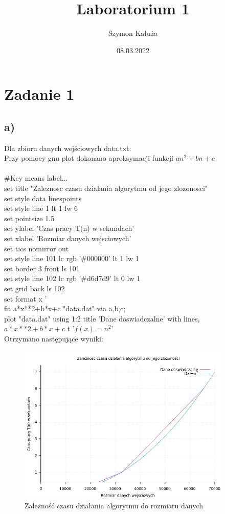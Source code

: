 \documentclass{article}
\title{Laboratorium 1}
\author{Szymon Kałuża}
\date{08.03.2022}
\begin{document}
\maketitle
\section{Zadanie 1}
\subsection{a)}
Dla zbioru danych wejściowych data.txt:\\
\endgroup
Przy pomocy gnu plot dokonano aproksymacji funkcji $an^2+bn+c$
\\\\
\#Key means label...\\
set title "Zaleznosc czasu dzialania algorytmu od jego zlozonosci"\\
set style data linespoints\\
set style line 1 lt 1 lw 6\\
set pointsize 1.5\\
set ylabel 'Czas pracy T(n) w sekundach'\\
set xlabel 'Rozmiar danych wejsciowych'\\
set tics nomirror out\\
set style line 101 lc rgb '\#000000' lt 1 lw 1\\
set border 3 front ls 101\\
set style line 102 lc rgb '\#d6d7d9' lt 0 lw 1\\
set grid back ls 102\\
set format x '%
\\
fit a*x**2+b*x+c "data.dat" via a,b,c;\\
plot "data.dat" using 1:2 title 'Dane doswiadczalne' with lines, $a*x**2+b*x+c$ t '$f(x)=n^2$'\\
Otrzymano następujące wyniki:\\
\endgroup
\begin{figure}[bhp]
    \centering
    \includegraphics[width=4in,height=3in]{zadanie1.png}
    \caption{Zależność czasu działania algorytmu do rozmiaru danych }
    \label{fig:my_label}
\end{figure}
\end{document}
